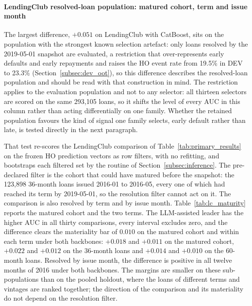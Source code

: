 \documentclass[final,5p,twocolumn]{elsarticle}
\providecommand{\DIFaddtex}[1]{{\protect\color{blue} \sf #1}} %
\providecommand{\DIFaddFL}[1]{\DIFadd{#1}} %
\providecommand{\DIFadd}[1]{\texorpdfstring{\DIFaddtex{#1}}{#1}} %
\begin{document}
\paragraph{\DIFaddFL{LendingClub resolved-loan population: matured cohort, term and issue month}}
\DIFaddFL{The largest difference, $+0.051$ on LendingClub with CatBoost, sits on the population with the strongest known selection artefact: only loans resolved by the 2019-05-01 snapshot are evaluated, a restriction that over-represents early defaults and early repayments and raises the HO event rate from 19.5\% in DEV to 23.3\% (Section~\ref{subsec:dev_oot}), so this difference describes the resolved-loan population and should be read with that construction in mind. The restriction applies to the evaluation population and not to any selector: all thirteen selectors are scored on the same 293,105 loans, so it shifts the level of every AUC in this column rather than acting differentially on one family. Whether the retained population favours the kind of signal one family selects, early default rather than late, is tested directly in the next paragraph.
}

\DIFaddFL{That test re-scores the LendingClub comparison of Table~\ref{tab:primary_results} on the frozen HO prediction vectors as row filters, with no refitting, and bootstraps each filtered set by the routine of Section~\ref{subsec:inference}. The pre-declared filter is the cohort that could have matured before the snapshot: the 123,898 36-month loans issued 2016-01 to 2016-05, every one of which had reached its term by 2019-05-01, so the resolution filter cannot act on it. The comparison is also resolved by term and by issue month. Table~\ref{tab:lc_maturity} reports the matured cohort and the two terms. The LLM-assisted leader has the higher AUC in all thirty comparisons, every interval excludes zero, and the difference clears the materiality bar of $0.010$ on the matured cohort and within each term under both backbones: $+0.018$ and $+0.011$ on the matured cohort, $+0.022$ and $+0.012$ on the 36-month loans and $+0.014$ and $+0.010$ on the 60-month loans. Resolved by issue month, the difference is positive in all twelve months of 2016 under both backbones. The margins are smaller on these sub-populations than on the pooled holdout, where the loans of different terms and vintages are ranked together; the direction of the comparison and its materiality do not depend on the resolution filter.
}
\end{document}
